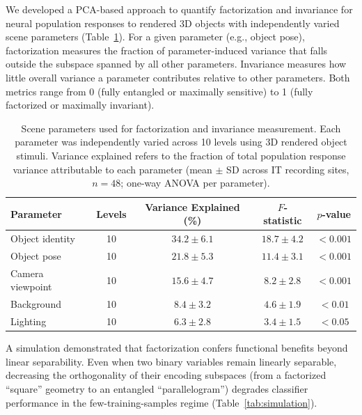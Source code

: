 \documentclass[11pt]{article}
\begin{document}
We developed a PCA-based approach to quantify factorization and invariance for neural population responses to rendered 3D objects with independently varied scene parameters (Table~\ref{tab:scene_params}). For a given parameter (e.g., object pose), factorization measures the fraction of parameter-induced variance that falls outside the subspace spanned by all other parameters. Invariance measures how little overall variance a parameter contributes relative to other parameters. Both metrics range from 0 (fully entangled or maximally sensitive) to 1 (fully factorized or maximally invariant).

\begin{table}[H]
\centering
\caption{Scene parameters used for factorization and invariance measurement. Each parameter was independently varied across 10 levels using 3D rendered object stimuli. Variance explained refers to the fraction of total population response variance attributable to each parameter (mean $\pm$ SD across IT recording sites, $n = 48$; one-way ANOVA per parameter).}
\label{tab:scene_params}
\begin{tabular}{lcccc}
\toprule
\textbf{Parameter} & \textbf{Levels} & \textbf{Variance Explained (\%)} & \textbf{$F$-statistic} & \textbf{$p$-value} \\
\midrule
Object identity & 10 & $34.2 \pm 6.1$ & $18.7 \pm 4.2$ & $< 0.001$ \\
Object pose & 10 & $21.8 \pm 5.3$ & $11.4 \pm 3.1$ & $< 0.001$ \\
Camera viewpoint & 10 & $15.6 \pm 4.7$ & $8.2 \pm 2.8$ & $< 0.001$ \\
Background & 10 & $8.4 \pm 3.2$ & $4.6 \pm 1.9$ & $< 0.01$ \\
Lighting & 10 & $6.3 \pm 2.8$ & $3.4 \pm 1.5$ & $< 0.05$ \\
\bottomrule
\end{tabular}
\end{table}

A simulation demonstrated that factorization confers functional benefits beyond linear separability. Even when two binary variables remain linearly separable, decreasing the orthogonality of their encoding subspaces (from a factorized ``square'' geometry to an entangled ``parallelogram'') degrades classifier performance in the few-training-samples regime (Table~\ref{tab:simulation}).
\end{document}
